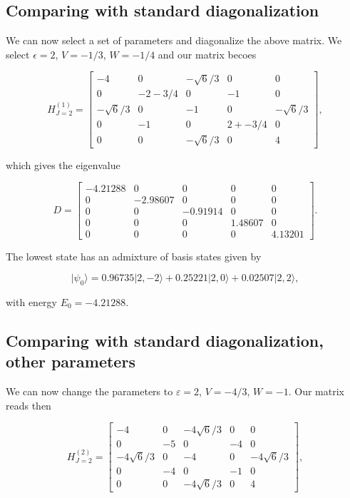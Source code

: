 \documentclass[11pt]{article}
\begin{document}
    \hypertarget{comparing-with-standard-diagonalization}{%
\subsection{Comparing with standard
diagonalization}\label{comparing-with-standard-diagonalization}}

We can now select a set of parameters and diagonalize the above matrix.
We select \(\epsilon = 2\), \(V = -1/3\), \(W = -1/4\) and our matrix
becoes

    \[
H_{J=2}^{(1)} =
\begin{bmatrix}
-4 & 0 & -\sqrt{6}/3 & 0 & 0 \\
0 & -2 - 3/4 & 0 & -1 & 0 \\
-\sqrt{6}/3 & 0 & -1 & 0 & -\sqrt{6}/3 \\
0 & -1 & 0 & 2 + -3/4 & 0 \\
0 & 0 & -\sqrt{6}/3 & 0 & 4
\end{bmatrix},
\]

    which gives the eigenvalue

    \[
D = \begin{bmatrix}
-4.21288 &  0 &  0 &  0 &  0 \\
0 & -2.98607  & 0  & 0  & 0 \\
0 &  0 & -0.91914  & 0  & 0 \\
0 &  0 & 0   & 1.48607  & 0 \\
0 &  0  & 0  & 0  & 4.13201
\end{bmatrix}.
\]

    The lowest state has an admixture of basis states given by

    \[
\vert \psi_0\rangle = 0.96735\vert2,-2\rangle + 0.25221\vert 2,0\rangle + 0.02507\vert 2,2\rangle,
\]

    with energy \(E_0 = -4.21288\).

    \hypertarget{comparing-with-standard-diagonalization-other-parameters}{%
\subsection{Comparing with standard diagonalization, other
parameters}\label{comparing-with-standard-diagonalization-other-parameters}}

We can now change the parameters to \(\varepsilon = 2\), \(V = -4/3\),
\(W = -1\). Our matrix reads then

    \[
H_{J=2}^{(2)} =
\begin{bmatrix}
-4 & 0 & -4\sqrt{6}/3 & 0 & 0 \\
0 & -5 & 0 & -4 & 0 \\
-4\sqrt{6}/3 & 0 & -4 & 0 & -4\sqrt{6}/3 \\
0 & -4 & 0 & -1 & 0 \\
0 & 0 & -4\sqrt{6}/3 & 0 & 4
\end{bmatrix},
\]
\end{document}
